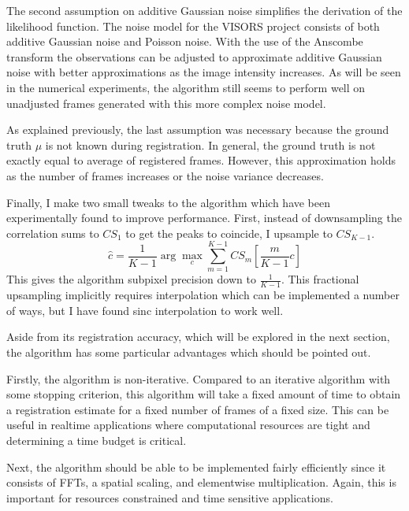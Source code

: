 \documentclass[tocnosub,noragright,centerchapter,12pt]{uiucecethesis09}
\begin{document}
The second assumption on additive Gaussian noise simplifies the derivation of the likelihood function.  The noise model for the VISORS project consists of both additive Gaussian noise and Poisson noise.  With the use of the Anscombe transform the observations can be adjusted to approximate additive Gaussian noise with better approximations as the image intensity increases.  As will be seen in the numerical experiments, the algorithm still seems to perform well on unadjusted frames generated with this more complex noise model.

As explained previously, the last assumption was necessary because the ground truth $\mu$ is not known during registration.  In general, the ground truth is not exactly equal to average of registered frames.  However, this approximation holds as the number of frames increases or the noise variance decreases.

Finally, I make two small tweaks to the algorithm which have been experimentally found to improve performance.  First, instead of downsampling the correlation sums to $CS_1$ to get the peaks to coincide, I upsample to $CS_{K-1}$.
$$\hat{c} = \frac{1}{K - 1} \arg \max_c \sum_{m=1}^{K-1} CS_m\left[\frac{m}{K-1}c\right]$$
This gives the algorithm subpixel precision down to $\frac{1}{K - 1}$.  This fractional upsampling implicitly requires interpolation which can be implemented a number of ways, but I have found sinc interpolation to work well.


Aside from its registration accuracy, which will be explored in the next section, the algorithm has some particular advantages which should be pointed out.

Firstly, the algorithm is non-iterative.  Compared to an iterative algorithm with some stopping criterion, this algorithm will take a fixed amount of time to obtain a registration estimate for a fixed number of frames of a fixed size.  This can be useful in realtime applications where computational resources are tight and determining a time budget is critical.

Next, the algorithm should be able to be implemented fairly efficiently since it consists of FFTs, a spatial scaling, and elementwise multiplication.  Again, this is important for resources constrained and time sensitive applications.
\end{document}
